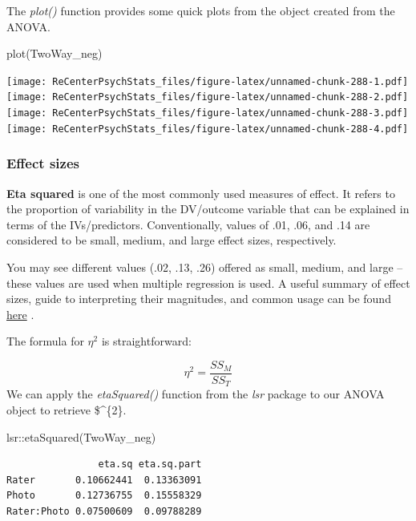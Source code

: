 \documentclass[
  11pt,
]{book}
\newenvironment{Shaded}{\begin{snugshade}}{\end{snugshade}}
\newcommand{\FunctionTok}[1]{\textcolor[rgb]{0.00,0.00,0.00}{#1}}
\newcommand{\NormalTok}[1]{#1}
\newcommand{\SpecialCharTok}[1]{\textcolor[rgb]{0.00,0.00,0.00}{#1}}
\begin{document}
The \emph{plot()} function provides some quick plots from the object created from the ANOVA.

\begin{Shaded}
\begin{Highlighting}[]
\FunctionTok{plot}\NormalTok{(TwoWay\_neg)}
\end{Highlighting}
\end{Shaded}

\texttt{[image: ReCenterPsychStats\_files/figure-latex/unnamed-chunk-288-1.pdf]} \texttt{[image: ReCenterPsychStats\_files/figure-latex/unnamed-chunk-288-2.pdf]} \texttt{[image: ReCenterPsychStats\_files/figure-latex/unnamed-chunk-288-3.pdf]} \texttt{[image: ReCenterPsychStats\_files/figure-latex/unnamed-chunk-288-4.pdf]}

\hypertarget{effect-sizes}{%
\subsubsection{Effect sizes}\label{effect-sizes}}

\textbf{Eta squared} is one of the most commonly used measures of effect. It refers to the proportion of variability in the DV/outcome variable that can be explained in terms of the IVs/predictors. Conventionally, values of .01, .06, and .14 are considered to be small, medium, and large effect sizes, respectively.

You may see different values (.02, .13, .26) offered as small, medium, and large -- these values are used when multiple regression is used. A useful summary of effect sizes, guide to interpreting their magnitudes, and common usage can be found \href{https://imaging.mrc-cbu.cam.ac.uk/statswiki/FAQ/effectSize}{here} \citep{watson_rules_2020}.

The formula for \(\eta ^{2}\) is straightforward:

\[\eta ^{2}=\frac{SS_{M}}{SS_{T}}\]
We can apply the \emph{etaSquared()} function from the \emph{lsr} package to our ANOVA object to retrieve \$\eta \^{}\{2\}.

\begin{Shaded}
\begin{Highlighting}[]
\NormalTok{lsr}\SpecialCharTok{::}\FunctionTok{etaSquared}\NormalTok{(TwoWay\_neg)}
\end{Highlighting}
\end{Shaded}

\begin{verbatim}
                eta.sq eta.sq.part
Rater       0.10662441  0.13363091
Photo       0.12736755  0.15558329
Rater:Photo 0.07500609  0.09788289
\end{verbatim}
\end{document}
